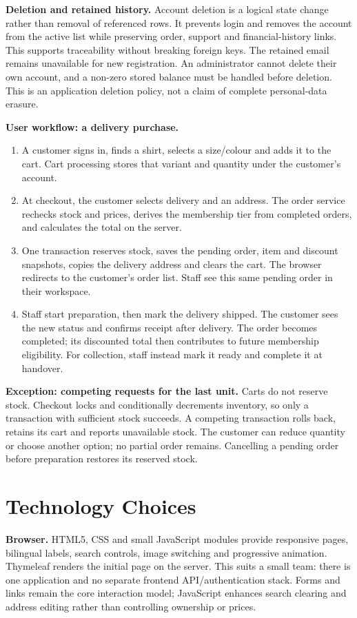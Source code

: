 \documentclass[11pt,a4paper]{article}
\begin{document}
\textbf{Deletion and retained history.} Account deletion is a logical state change rather than removal of referenced rows. It prevents login and removes the account from the active list while preserving order, support and financial-history links. This supports traceability without breaking foreign keys. The retained email remains unavailable for new registration. An administrator cannot delete their own account, and a non-zero stored balance must be handled before deletion. This is an application deletion policy, not a claim of complete personal-data erasure.

\newpage
\textbf{User workflow: a delivery purchase.}
\begin{enumerate}
\item A customer signs in, finds a shirt, selects a size/colour and adds it to the cart. Cart processing stores that variant and quantity under the customer's account.
\item At checkout, the customer selects delivery and an address. The order service rechecks stock and prices, derives the membership tier from completed orders, and calculates the total on the server.
\item One transaction reserves stock, saves the pending order, item and discount snapshots, copies the delivery address and clears the cart. The browser redirects to the customer's order list. Staff see this same pending order in their workspace.
\item Staff start preparation, then mark the delivery shipped. The customer sees the new status and confirms receipt after delivery. The order becomes completed; its discounted total then contributes to future membership eligibility. For collection, staff instead mark it ready and complete it at handover.
\end{enumerate}
\textbf{Exception: competing requests for the last unit.} Carts do not reserve stock. Checkout locks and conditionally decrements inventory, so only a transaction with sufficient stock succeeds. A competing transaction rolls back, retains its cart and reports unavailable stock. The customer can reduce quantity or choose another option; no partial order remains. Cancelling a pending order before preparation restores its reserved stock.

\section{Technology Choices}
\textbf{Browser.} HTML5, CSS and small JavaScript modules provide responsive pages, bilingual labels, search controls, image switching and progressive animation. Thymeleaf renders the initial page on the server. This suits a small team: there is one application and no separate frontend API/authentication stack. Forms and links remain the core interaction model; JavaScript enhances search clearing and address editing rather than controlling ownership or prices.
\end{document}
